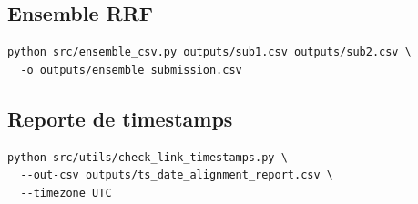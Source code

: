 \subsection{Ensemble RRF}
\begin{verbatim}
python src/ensemble_csv.py outputs/sub1.csv outputs/sub2.csv \
  -o outputs/ensemble_submission.csv
\end{verbatim}

\subsection{Reporte de timestamps}
\begin{verbatim}
python src/utils/check_link_timestamps.py \
  --out-csv outputs/ts_date_alignment_report.csv \
  --timezone UTC
\end{verbatim}
